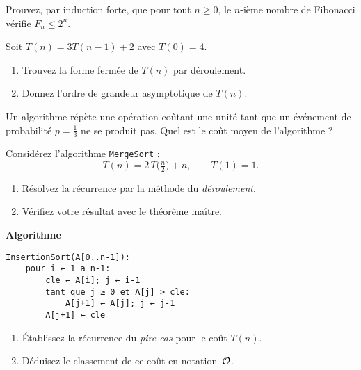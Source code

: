\begin{exercice}
Prouvez, par induction forte, que pour tout \(n\ge 0\),
le \(n\)-ième nombre de Fibonacci vérifie
\(F_{n}\le 2^{n}\).  %
\end{exercice}

\begin{exercice}
Soit \(T(n)=3T(n-1)+2\) avec \(T(0)=4\).
\begin{enumerate}[label=\alph*)]
  \item Trouvez la forme fermée de \(T(n)\) par déroulement.
  \item Donnez l’ordre de grandeur asymptotique de \(T(n)\).
\end{enumerate} %
\end{exercice}

\begin{exercice}
Un algorithme répète une opération coûtant une unité tant que
un événement de probabilité \(p=\tfrac13\) ne se produit pas.
Quel est le coût moyen de l’algorithme ?  %
\end{exercice}

\begin{exercice}
Considérez l’algorithme \texttt{MergeSort} :
\[
T(n)=2\,T\!\bigl(\tfrac{n}{2}\bigr)+n,\qquad T(1)=1.
\]
\begin{enumerate}[label=\alph*)]
  \item Résolvez la récurrence par la méthode du \emph{déroulement}.
  \item Vérifiez votre résultat avec le théorème maître.
\end{enumerate} %
\end{exercice}

\begin{exercice}
\textbf{Algorithme}\\[-1.1em]
\begin{lstlisting}
InsertionSort(A[0..n-1]):
    pour i ← 1 a n-1:
        cle ← A[i]; j ← i-1
        tant que j ≥ 0 et A[j] > cle:
            A[j+1] ← A[j]; j ← j-1
        A[j+1] ← cle
\end{lstlisting}

\begin{enumerate}[label=\alph*)]
  \item Établissez la récurrence du \emph{pire cas} pour le coût $T(n)$.
  \item Déduisez le classement de ce coût en notation~$\mathcal{O}$.
\end{enumerate} %
\end{exercice}

